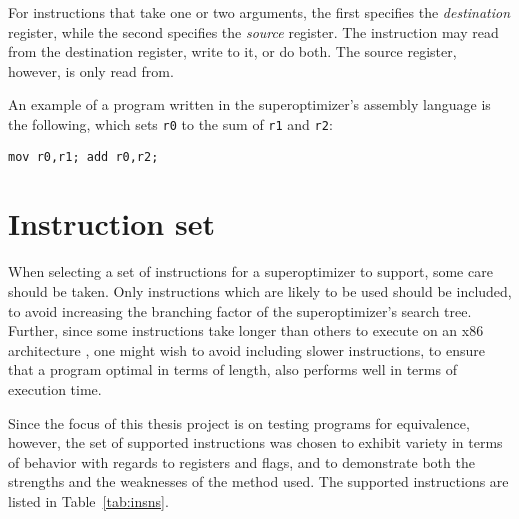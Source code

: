 \documentclass[a4paper,11pt]{kth-mag}
\begin{document}
For instructions that take one or two arguments, the first specifies the \emph{destination} register, while the second specifies the \emph{source} register.
The instruction may read from the destination register, write to it, or do both.
The source register, however, is only read from.

An example of a program written in the superoptimizer's assembly language is the following, which sets \verb|r0| to the sum of \verb|r1| and \verb|r2|:

\begin{verbatim}
mov r0,r1; add r0,r2;
\end{verbatim}

\section{Instruction set}

When selecting a set of instructions for a superoptimizer to support, some care should be taken.
Only instructions which are likely to be used should be included, to avoid increasing the branching factor of the superoptimizer's search tree.
Further, since some instructions take longer than others to execute on an x86 architecture \cite{x86_timing}, one might wish to avoid including slower instructions, to ensure that a program optimal in terms of length, also performs well in terms of execution time.

Since the focus of this thesis project is on testing programs for equivalence, however, the set of supported instructions was chosen to exhibit variety in terms of behavior with regards to registers and flags, and to demonstrate both the strengths and the weaknesses of the method used. The supported instructions are listed in Table~\ref{tab:insns}.
\end{document}
